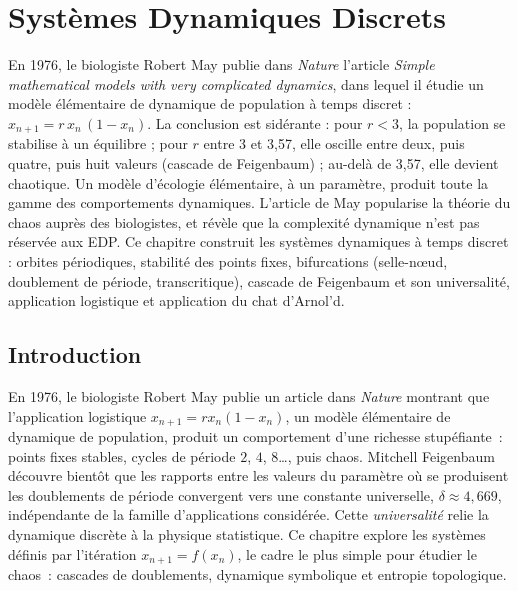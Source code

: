 \chapter{Syst\`emes Dynamiques Discrets}
\label{ch:discrets}

En 1976, le biologiste Robert May publie dans \emph{Nature} l'article \emph{Simple mathematical models with very complicated dynamics}, dans lequel il étudie un modèle élémentaire de dynamique de population à temps discret : $x_{n+1} = r\,x_n\,(1 - x_n)$. La conclusion est sidérante : pour $r < 3$, la population se stabilise à un équilibre ; pour $r$ entre 3 et 3,57, elle oscille entre deux, puis quatre, puis huit valeurs (cascade de Feigenbaum) ; au-delà de 3,57, elle devient chaotique. Un modèle d'écologie élémentaire, à un paramètre, produit toute la gamme des comportements dynamiques. L'article de May popularise la théorie du chaos auprès des biologistes, et révèle que la complexité dynamique n'est pas réservée aux EDP. Ce chapitre construit les systèmes dynamiques à temps discret : orbites périodiques, stabilité des points fixes, bifurcations (selle-nœud, doublement de période, transcritique), cascade de Feigenbaum et son universalité, application logistique et application du chat d'Arnol'd.

\section{Introduction}

En 1976, le biologiste Robert May publie un article dans \emph{Nature} montrant que l'application logistique $x_{n+1} = r x_n(1 - x_n)$, un mod\`ele \'el\'ementaire de dynamique de population, produit un comportement d'une richesse stupéfiante~: points fixes stables, cycles de p\'eriode $2$, $4$, $8$\ldots{}, puis chaos. Mitchell Feigenbaum d\'ecouvre bient\^ot que les rapports entre les valeurs du param\`etre o\`u se produisent les doublements de p\'eriode convergent vers une constante universelle, $\delta \approx 4{,}669$, ind\'ependante de la famille d'applications consid\'er\'ee. Cette \emph{universalit\'e} relie la dynamique discr\`ete \`a la physique statistique. Ce chapitre explore les syst\`emes d\'efinis par l'it\'eration $x_{n+1} = f(x_n)$, le cadre le plus simple pour \'etudier le chaos~: cascades de doublements, dynamique symbolique et entropie topologique.

